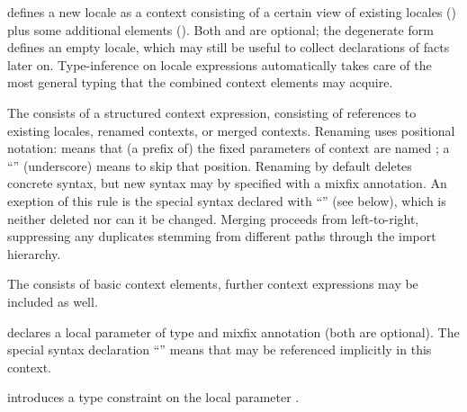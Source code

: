 \begin{isabellebody}
\begin{isamarkuptext}
  \begin{descr}
  
  \item [\mbox{\isa{\isacommand{locale}}}~\isa{loc\ {\isacharequal}\ import\ {\isacharplus}\ body}] defines a
  new locale  as a context consisting of a certain view of
  existing locales () plus some additional elements
  ().  Both  and  are optional;
  the degenerate form \mbox{}~ defines an empty
  locale, which may still be useful to collect declarations of facts
  later on.  Type-inference on locale expressions automatically takes
  care of the most general typing that the combined context elements
  may acquire.

  The  consists of a structured context expression,
  consisting of references to existing locales, renamed contexts, or
  merged contexts.  Renaming uses positional notation:  means that (a prefix of) the fixed
  parameters of context  are named ; a ``\isa{{\isacharunderscore}}'' (underscore) means to skip that
  position.  Renaming by default deletes concrete syntax, but new
  syntax may by specified with a mixfix annotation.  An exeption of
  this rule is the special syntax declared with ``\isa{{\isacharparenleft}{\isasymSTRUCTURE}{\isacharparenright}}'' (see below), which is neither deleted nor can it
  be changed.  Merging proceeds from left-to-right, suppressing any
  duplicates stemming from different paths through the import
  hierarchy.

  The  consists of basic context elements, further context
  expressions may be included as well.

  \begin{descr}

  \item [\mbox{\isa{\isakeyword{fixes}}}~\isa{x\ {\isacharcolon}{\isacharcolon}\ {\isasymtau}\ {\isacharparenleft}mx{\isacharparenright}}] declares a local
  parameter of type \isa{{\isasymtau}} and mixfix annotation  (both
  are optional).  The special syntax declaration ``\isa{{\isacharparenleft}{\isasymSTRUCTURE}{\isacharparenright}}'' means that  may be referenced
  implicitly in this context.

  \item [\mbox{\isa{\isakeyword{constrains}}}~\isa{x\ {\isacharcolon}{\isacharcolon}\ {\isasymtau}}] introduces a type
  constraint \isa{{\isasymtau}} on the local parameter .


\end{descr}
\end{descr}
\end{isamarkuptext}
\end{isabellebody}
